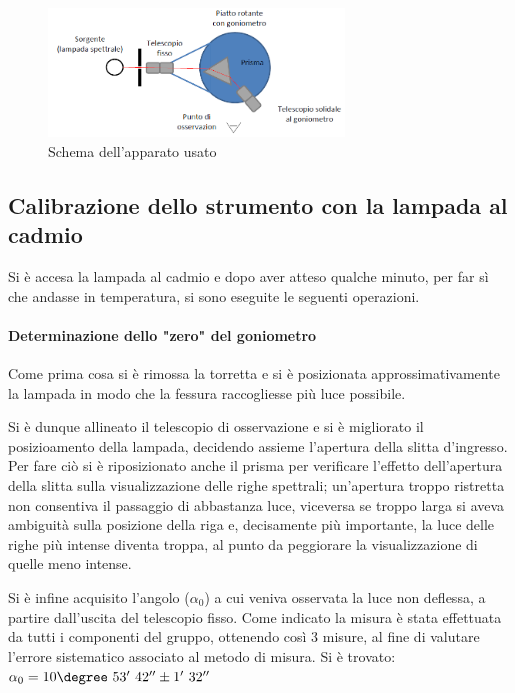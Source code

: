 \documentclass[a4paper,10pt]{article}
\begin{document}
\begin{figure}[H]
	\centering
	\includegraphics[width=0.7\textwidth]{../grafici/Schema1.png}
	\caption{Schema dell'apparato usato}
	\label{fig:schema1}
\end{figure}

\subsection{Calibrazione dello strumento con la lampada al cadmio}

Si è accesa la lampada al cadmio e dopo aver atteso qualche minuto, per far sì che andasse in temperatura, si sono eseguite le seguenti operazioni.

\paragraph{Determinazione dello "zero" del goniometro} Come prima cosa si è rimossa la torretta e si è posizionata approssimativamente la lampada in modo che la fessura raccogliesse più luce possibile. 

Si è dunque allineato il telescopio di osservazione e si è migliorato il posizioamento della lampada, decidendo assieme l'apertura della slitta d'ingresso. Per fare ciò si è riposizionato anche il prisma per verificare l'effetto dell'apertura della slitta sulla visualizzazione delle righe spettrali; un'apertura troppo ristretta non consentiva il passaggio di abbastanza luce, viceversa se troppo larga si aveva ambiguità sulla posizione della riga e, decisamente più importante, la luce delle righe più intense diventa troppa, al punto da peggiorare la visualizzazione di quelle meno intense.

Si è infine acquisito l'angolo ($\alpha_0$) a cui veniva osservata la luce non deflessa, a partire dall'uscita del telescopio fisso. Come indicato la misura è stata effettuata da tutti i componenti del gruppo, ottenendo così 3 misure, al fine di valutare l'errore sistematico associato al metodo di misura.
Si è trovato: $\alpha_0 = 10\degree~53'~42''\pm 1'~32''$
\end{document}
